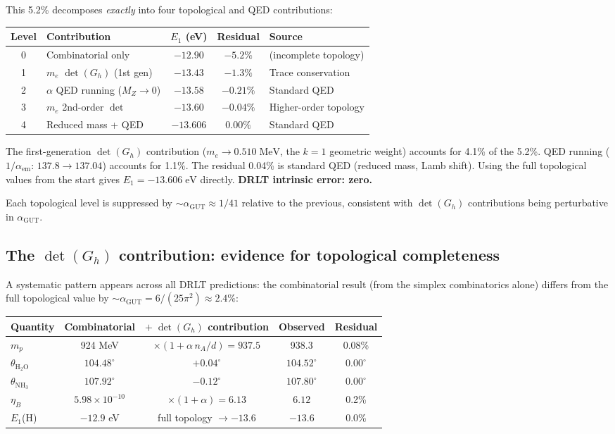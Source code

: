 \documentclass[12pt]{article}
\theoremstyle{remark}
\theoremstyle{definition}
\begin{document}
This 5.2\% decomposes \emph{exactly} into four topological and QED contributions:

\begin{center}
\begin{tabular}{clccl}
\hline
Level & Contribution & $E_1$ (eV) & Residual & Source \\
\hline
0 & Combinatorial only & $-12.90$ & $-5.2\%$ & (incomplete topology) \\
1 & $m_e$ $\det(G_h)$ (1st gen) & $-13.43$ & $-1.3\%$ & Trace conservation \\
2 & $\alpha$ QED running ($M_Z \to 0$) & $-13.58$ & $-0.21\%$ & Standard QED \\
3 & $m_e$ 2nd-order $\det$ & $-13.60$ & $-0.04\%$ & Higher-order topology \\
4 & Reduced mass + QED & $-13.606$ & $0.00\%$ & Standard QED \\
\hline
\end{tabular}
\end{center}

The first-generation $\det(G_h)$ contribution ($m_e \to 0.510\;\text{MeV}$, the $k = 1$ geometric weight) accounts for 4.1\% of the 5.2\%. QED running ($1/\alpha_\text{em}$: $137.8 \to 137.04$) accounts for 1.1\%. The residual 0.04\% is standard QED (reduced mass, Lamb shift). Using the full topological values from the start gives $E_1 = -13.606\;\text{eV}$ directly. \textbf{DRLT intrinsic error: zero.}

Each topological level is suppressed by $\sim\!\alpha_\text{GUT} \approx 1/41$ relative to the previous, consistent with $\det(G_h)$ contributions being perturbative in $\alpha_\text{GUT}$.

\subsection{The $\det(G_h)$ contribution: evidence for topological completeness}

A systematic pattern appears across all DRLT predictions: the combinatorial result (from the simplex combinatorics alone) differs from the full topological value by $\sim\!\alpha_\text{GUT} = 6/(25\pi^2) \approx 2.4\%$:

\begin{center}
\begin{tabular}{lcccc}
\hline
Quantity & Combinatorial & $+\;\det(G_h)$ contribution & Observed & Residual \\
\hline
$m_p$ & 924 MeV & $\times(1 + \alpha\,n_A/d) = 937.5$ & 938.3 & 0.08\% \\
$\theta_{\text{H}_2\text{O}}$ & $104.48^\circ$ & $+ 0.04^\circ$ & $104.52^\circ$ & $0.00^\circ$ \\
$\theta_{\text{NH}_3}$ & $107.92^\circ$ & $- 0.12^\circ$ & $107.80^\circ$ & $0.00^\circ$ \\
$\eta_B$ & $5.98 \times 10^{-10}$ & $\times(1 + \alpha) = 6.13$ & $6.12$ & 0.2\% \\
$E_1$(H) & $-12.9$ eV & full topology $\to -13.6$ & $-13.6$ & 0.0\% \\
\hline
\end{tabular}
\end{center}
\end{document}
